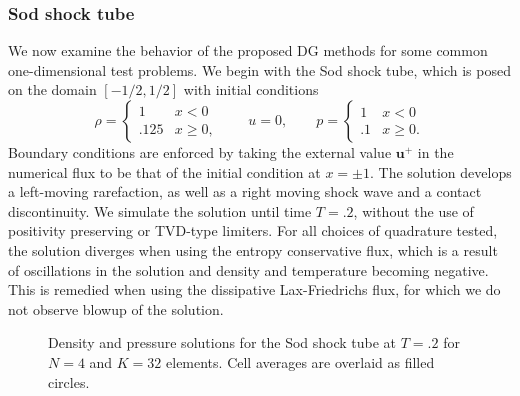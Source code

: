 \documentclass[preprint,10pt]{elsarticle}
\theoremstyle{definition}
\theoremstyle{lemma}
\theoremstyle{theorem}
\theoremstyle{assumption}
\begin{document}
\subsubsection{Sod shock tube}

We now examine the behavior of the proposed DG methods for some common one-dimensional test problems.  We begin with the Sod shock tube, which is posed on the domain $[-1/2,1/2]$ with initial conditions
\[
\rho = \begin{cases}
1 & x < 0\\
.125 & x \geq 0,
\end{cases} 
\qquad
u = 0, \qquad
p = \begin{cases}
1 & x < 0\\
.1 & x \geq 0.
\end{cases}
\]
Boundary conditions are enforced by taking the external value $\bm{u}^+$ in the numerical flux to be that of the initial condition at $x = \pm 1$.  The solution develops a left-moving rarefaction, as well as a right moving shock wave and a contact discontinuity.  We simulate the solution until time $T = .2$, without the use of positivity preserving or TVD-type limiters.  For all choices of quadrature tested, the solution diverges when using the entropy conservative flux, which is a result of oscillations in the solution and density and temperature becoming negative.  This is remedied when using the dissipative Lax-Friedrichs flux, for which we do not observe blowup of the solution.  
\begin{figure}
\centering
{}
\hspace{.1em}
\caption{Density and pressure solutions for the Sod shock tube at $T = .2$ for $N = 4$ and $K = 32$ elements.  Cell averages are overlaid as filled circles.  }
\label{fig:sod}
\end{figure}
\end{document}
